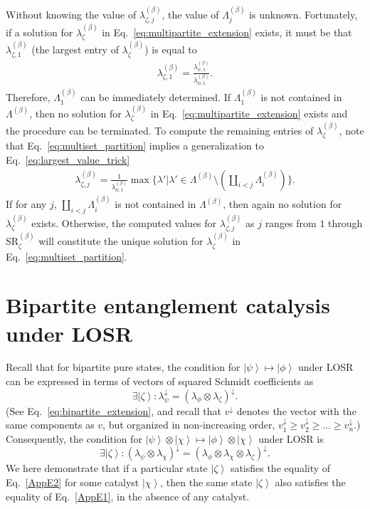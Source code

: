 \documentclass[12pt]{article}
\newcommand{\rob}{\color{black}}
\newcommand{\blk}{\color{black}}
\newcommand{\ket}[1]{\left| #1 \right>}
\theoremstyle{plain}
\theoremstyle{definition}
\begin{document}
\begin{appendices}
Without knowing the value of $\lambda_{\zeta,j}^{(\beta)}$, the value of $\Lambda_{j}^{(\beta)}$ is unknown. Fortunately, if a solution for $\lambda_{\zeta}^{(\beta)}$ in Eq.~\eqref{eq:multipartite_extension} exists, it must be that $\lambda_{\zeta,1}^{(\beta)}$ (the largest entry of $\lambda_{\zeta}^{(\beta)}$) is equal to
\begin{align}
    \label{eq:largest_value_trick}
    \lambda_{\zeta,1}^{(\beta)} = \frac{\lambda_{\psi,1}^{(\beta)}}{\lambda_{\phi,1}^{(\beta)}}.
\end{align}
Therefore, $\Lambda_{1}^{(\beta)}$ can be immediately determined. If $\Lambda_{1}^{(\beta)}$ is not contained in $\Lambda^{(\beta)}$, then no solution for $\lambda_{\zeta}^{(\beta)}$ in Eq.~\eqref{eq:multipartite_extension} exists and the procedure can be terminated. To compute the remaining entries of $\lambda_{\zeta}^{(\beta)}$, note that Eq.~\eqref{eq:multiset_partition} implies a generalization to Eq.~\eqref{eq:largest_value_trick}
\begin{align}
    \lambda_{\zeta,j}^{(\beta)} = \frac{1}{\lambda_{\phi,1}^{(\beta)}}\max\{ \lambda' | \lambda' \in \Lambda^{(\beta)} \setminus (\coprod_{i<j}\Lambda_{i}^{(\beta)}) \}.
\end{align}
If for any $j$, $\coprod_{i<j}\Lambda_{i}^{(\beta)}$ is not contained in $\Lambda^{(\beta)}$, then again no solution for $\lambda_{\zeta}^{(\beta)}$ exists. Otherwise, the computed values for $\lambda_{\zeta,j}^{(\beta)}$ as $j$ ranges from $1$ through $\mathrm{SR}_{\zeta}^{(\beta)}$ will constitute the unique solution for $\lambda_{\zeta}^{(\beta)}$ in Eq.~\eqref{eq:multiset_partition}.
\blk

\section{Bipartite entanglement catalysis under LOSR}\label{catalysis}


Recall that for bipartite pure states, the condition for $\ket \psi \mapsto \ket \phi$ under LOSR can be expressed in terms of vectors of squared Schmidt coefficients as
\begin{equation}\label{AppE1}
\exists \ket \zeta: \lambda_{\psi}^{\downarrow} = (\lambda_{\phi} \otimes \lambda_{\zeta})^{\downarrow}.
\end{equation}
(See Eq.~\eqref{eq:bipartite_extension},  and recall that  $v^{\downarrow}$ denotes the vector with the same components as $v$, but organized in non-increasing order, $v^{\downarrow}_1 \ge v^{\downarrow}_2  \ge \dots \ge v^{\downarrow}_n $.\blk )
Consequently, the condition for $\ket \psi \otimes \ket \chi \mapsto \ket \phi \otimes \ket \chi$ under LOSR is 
\begin{equation}\label{AppE2}
\exists \ket \zeta: (\lambda_{\psi}\otimes \lambda_{\chi})^{\downarrow} = (\lambda_{\phi} \otimes \lambda_{\chi} \otimes \lambda_{\zeta})^{\downarrow}.
\end{equation}  
\rob We here demonstrate that if a particular state $\ket \zeta$ satisfies the equality of Eq.~\eqref{AppE2} for some catalyst $\ket \chi$, then the same state $\ket \zeta$ also satisfies the equality of Eq.~\eqref{AppE1}, in the absence of any catalyst.


\end{appendices}
\end{document}
